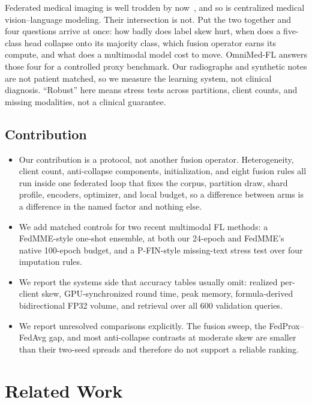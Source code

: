 \documentclass[letterpaper, conference]{IEEEtran}
\begin{document}
Federated medical imaging is well trodden by
now~\cite{Sheller2020,Dou2021,Kaissis2021}, and so is centralized medical
vision--language modeling. Their intersection is not. Put the two together and four
questions arrive at once: how badly does label skew hurt, when does a five-class head
collapse onto its majority class, which fusion operator earns its compute, and what
does a multimodal model cost to move. OmniMed-FL
answers those four for a controlled proxy benchmark. Our radiographs and synthetic notes are not patient matched,
so we measure the learning system, not clinical diagnosis. ``Robust'' here means
stress tests across partitions, client counts, and missing modalities, not a
clinical guarantee.

\subsection{Contribution}
\begin{itemize}
\item Our contribution is a protocol, not another fusion operator. Heterogeneity,
client count, anti-collapse components, initialization, and eight fusion rules all
run inside one federated loop that fixes the corpus, partition draw, shard profile,
encoders, optimizer, and local budget, so a difference between arms is a difference
in the named factor and nothing else.
\item We add matched controls for two recent multimodal FL methods: a FedMME-style
one-shot ensemble, at both our 24-epoch and FedMME's native 100-epoch budget, and a
P-FIN-style missing-text stress test over four imputation rules.
\item We report the systems side that accuracy tables usually omit: realized
per-client skew, GPU-synchronized round time, peak memory, formula-derived
bidirectional FP32 volume, and retrieval over all 600 validation queries.
\item We report unresolved comparisons explicitly. The fusion sweep, the
FedProx--FedAvg gap, and most anti-collapse contrasts at moderate skew are smaller
than their two-seed spreads and therefore do not support a reliable ranking.
\end{itemize}


\section{Related Work}
\end{document}
